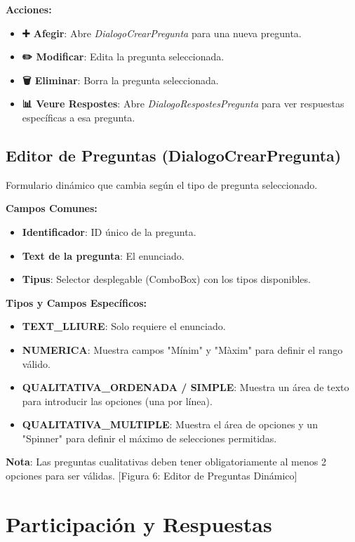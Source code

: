 \documentclass[a4paper,12pt]{article}
\begin{document}
\textbf{Acciones:}
\begin{itemize}
    \item \textbf{➕ Afegir}: Abre \textit{DialogoCrearPregunta} para una nueva pregunta.
    \item \textbf{✏️ Modificar}: Edita la pregunta seleccionada.
    \item \textbf{🗑️ Eliminar}: Borra la pregunta seleccionada.
    \item \textbf{📊 Veure Respostes}: Abre \textit{DialogoRespostesPregunta} para ver respuestas específicas a esa pregunta.
\end{itemize}

\subsection{Editor de Preguntas (DialogoCrearPregunta)}
Formulario dinámico que cambia según el tipo de pregunta seleccionado.

\textbf{Campos Comunes:}
\begin{itemize}
    \item \textbf{Identificador}: ID único de la pregunta.
    \item \textbf{Text de la pregunta}: El enunciado.
    \item \textbf{Tipus}: Selector desplegable (ComboBox) con los tipos disponibles.
\end{itemize}

\textbf{Tipos y Campos Específicos:}
\begin{itemize}
    \item \textbf{TEXT\_LLIURE}: Solo requiere el enunciado.
    \item \textbf{NUMERICA}: Muestra campos "Mínim" y "Màxim" para definir el rango válido.
    \item \textbf{QUALITATIVA\_ORDENADA / SIMPLE}: Muestra un área de texto para introducir las opciones (una por línea).
    \item \textbf{QUALITATIVA\_MULTIPLE}: Muestra el área de opciones y un "Spinner" para definir el máximo de selecciones permitidas.
\end{itemize}
\textbf{Nota}: Las preguntas cualitativas deben tener obligatoriamente al menos 2 opciones para ser válidas.
[Figura 6: Editor de Preguntas Dinámico]

\section{Participación y Respuestas}
\end{document}
